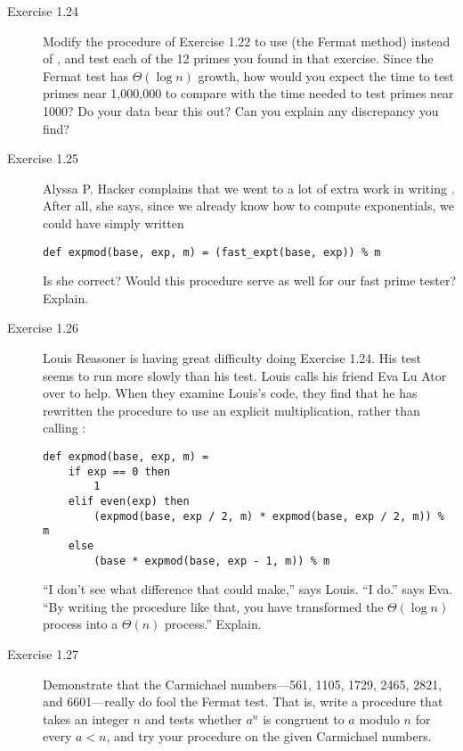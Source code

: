 \begin{description}
\item[Exercise 1.24] Modify the  procedure of Exercise 1.22 to use  (the Fermat method) instead of , and test each of the 12 primes you found in that exercise. Since the Fermat test has $\Theta(\log n)$ growth, how would you expect the time to test primes near 1,000,000 to compare with the time needed to test primes near 1000? Do your data bear this out? Can you explain any discrepancy you find?

\item[Exercise 1.25] Alyssa P. Hacker complains that we went to a lot of extra work in writing . After all, she says, since we already know how to compute exponentials, we could have simply written

\begin{lstlisting}
def expmod(base, exp, m) = (fast_expt(base, exp)) % m
\end{lstlisting}

Is she correct? Would this procedure serve as well for our fast prime tester? Explain.

\item[Exercise 1.26] Louis Reasoner is having great difficulty doing Exercise 1.24. His  test seems to run more slowly than his  test. Louis calls his friend Eva Lu Ator over to help. When they examine Louis's code, they find that he has rewritten the  procedure to use an explicit multiplication, rather than calling :

\begin{lstlisting}
def expmod(base, exp, m) =
    if exp == 0 then
        1
    elif even(exp) then
        (expmod(base, exp / 2, m) * expmod(base, exp / 2, m)) % m
    else
        (base * expmod(base, exp - 1, m)) % m
\end{lstlisting}

``I don't see what difference that could make,'' says Louis. ``I do.'' says Eva. ``By writing the procedure like that, you have transformed the $\Theta(\log n)$ process into a $\Theta(n)$ process.'' Explain.

\item[Exercise 1.27] Demonstrate that the Carmichael numbers---561, 1105, 1729, 2465, 2821, and 6601---really do fool the Fermat test. That is, write a procedure that takes an integer $n$ and tests whether $a^n$ is congruent to $a$ modulo $n$ for every $a < n$, and try your procedure on the given Carmichael numbers.


\end{description}
